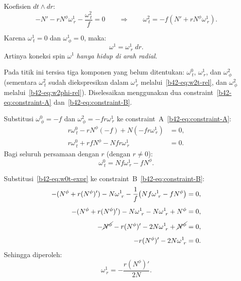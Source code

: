 \noindent Koefisien $dt \wedge dr$:
\begin{equation}
    -N' - rN^\phi\omega^1_{\ r} - \frac{\omega^2_{\ t}}{f} = 0 \qquad \Longrightarrow \qquad \omega^2_{\ t} = -f\!\left(N' + rN^\phi\omega^1_{\ r}\right). \label{b42-eq:w2t-rel}
\end{equation}
 
Karena $\omega^1_{\ t} = 0$ dan $\omega^1_{\ \phi} = 0$, maka:
\begin{equation}
    \omega^1 = \omega^1_{\ r}\;dr. \label{b42-eq:w1-radial}
\end{equation}
Artinya koneksi spin $\omega^1$ \emph{hanya hidup di arah radial}.
 
Pada titik ini tersisa tiga komponen yang belum ditentukan: $\omega^0_{\ t}$, $\omega^1_{\ r}$, dan $\omega^2_{\ \phi}$ (sementara $\omega^2_{\ t}$ sudah diekspresikan dalam $\omega^1_{\ r}$ melalui~\eqref{b42-eq:w2t-rel}, dan $\omega^2_{\ \phi}$ melalui~\eqref{b42-eq:w2phi-rel}). Diselesaikan menggunakan dua constraint~\eqref{b42-eq:constraint-A} dan~\eqref{b42-eq:constraint-B}.
 
\noindent Substitusi $\omega^0_{\ \phi} = -f$ dan $\omega^2_{\ \phi} = -fr\omega^1_{\ r}$ ke constraint~A~\eqref{b42-eq:constraint-A}:
\begin{align}
    r\omega^0_{\ t} - rN^\phi(-f) + N(-fr\omega^1_{\ r}) &= 0, \nonumber\\[4pt]
    r\omega^0_{\ t} + rfN^\phi - Nfr\omega^1_{\ r} &= 0.
\end{align}
Bagi seluruh persamaan dengan $r$ (dengan $r \neq 0$):
\begin{equation}
    \omega^0_{\ t} = Nf\omega^1_{\ r} - fN^\phi. \label{b42-eq:w0t-expr}
\end{equation}
 
\noindent Substitusi~\eqref{b42-eq:w0t-expr} ke constraint~B~\eqref{b42-eq:constraint-B}:
\begin{align}
    -(N^\phi + r(N^\phi)') - N\omega^1_{\ r} - \frac{1}{f}\!\left(Nf\omega^1_{\ r} - fN^\phi\right) &= 0, \nonumber\\[4pt]
    -(N^\phi + r(N^\phi)') - N\omega^1_{\ r} - N\omega^1_{\ r} + N^\phi &= 0, \nonumber\\[4pt]
    -\cancel{N^\phi} - r(N^\phi)' - 2N\omega^1_{\ r} + \cancel{N^\phi} &= 0, \nonumber\\[4pt]
    -r(N^\phi)' - 2N\omega^1_{\ r} &= 0.
\end{align}
Sehingga diperoleh:
\begin{equation}
    \omega^1_{\ r} = -\frac{r(N^\phi)'}{2N}. \label{b42-eq:w1r-final}
\end{equation}
 
